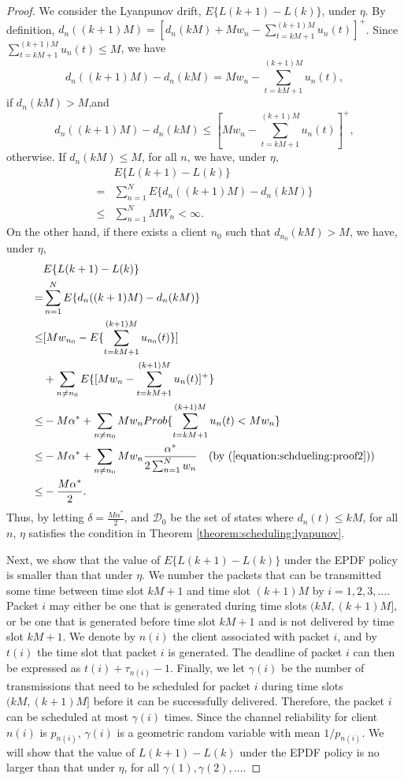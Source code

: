 \documentclass[10pt,nocopyrightspace]{sigplan-proc-varsize-1in}
\begin{document}
\begin{proof}
We consider the Lyanpunov drift, $E\{L(k+1)-L(k)\}$, under $\eta$. By definition, $d_n((k+1)M)=[d_n(kM)+Mw_n-\sum_{t=kM+1}^{(k+1)M}u_n(t)]^+$. Since $\sum_{t=kM+1}^{(k+1)M}u_n(t)\leq M$, we have
\begin{equation}
d_n((k+1)M)-d_n(kM)=Mw_n-\sum_{t=kM+1}^{(k+1)M}u_n(t),
\end{equation}
if $d_n(kM)>M$,and
\begin{equation}
d_n((k+1)M)-d_n(kM)\leq [Mw_n-\sum_{t=kM+1}^{(k+1)M}u_n(t)]^+,
\end{equation}
otherwise. If $d_n(kM)\leq M$, for all $n$, we have, under $\eta$,
\begin{align*}
&E\{L(k+1)-L(k)\}\\
=&\sum_{n=1}^NE\{d_n((k+1)M)-d_n(kM)\}\\
\leq& \sum_{n=1}^NMW_n<\infty.
\end{align*}
On the other hand, if there exists a client $n_0$ such that $d_{n_0}(kM)>M$, we have, under $\eta$,
\begin{align*}
&E\{L(k+1)-L(k)\}\\
=&\sum_{n=1}^NE\{d_n((k+1)M)-d_n(kM)\}\\
\leq& [Mw_{n_0}-E\{\sum_{t=kM+1}^{(k+1)M}u_{n_0}(t)\}]\\
&+\sum_{n\neq n_0}E\{[Mw_n-\sum_{t=kM+1}^{(k+1)M}u_n(t)]^+\}\\
\leq& -M\alpha^*+\sum_{n\neq n_0}Mw_nProb\{\sum_{t=kM+1}^{(k+1)M}u_n(t)<Mw_n\}\\
\leq& -M\alpha^*+\sum_{n\neq n_0}Mw_n\frac{\alpha^*}{2\sum_{n=1}^Nw_n}\hspace{10pt}\mbox{(by (\ref{equation:schdueling:proof2}))}\\
\leq& -\frac{M\alpha^*}{2}.
\end{align*}
Thus, by letting $\delta=\frac{M\alpha^*}{2}$, and $\mathcal{D}_0$ be the set of states where $d_n(t)\leq kM$, for all $n$, $\eta$ satisfies the condition in Theorem \ref{theorem:scheduling:lyapunov}.

Next, we show that the value of $E\{L(k+1)-L(k)\}$ under the EPDF policy is smaller than that under $\eta$. We number the packets that can be transmitted some time between time slot $kM+1$ and time slot $(k+1)M$ by $i=1,2,3,\dots$. Packet $i$ may either be one that is generated during time slots $(kM, (k+1)M]$, or be one that is generated before time slot $kM+1$ and is not delivered by time slot $kM+1$. We denote by $n(i)$ the client associated with packet $i$, and by $t(i)$ the time slot that packet $i$ is generated. The deadline of packet $i$ can then be expressed as $t(i)+\tau_{n(i)}-1$. Finally, we let $\gamma(i)$ be the number of transmissions that need to be scheduled for packet $i$ during time slots $(kM, (k+1)M]$ before it can be successfully delivered. Therefore, the packet $i$ can be scheduled at most $\gamma(i)$ times. Since the channel reliability for client $n(i)$ is $p_{n(i)}$, $\gamma(i)$ is a geometric random variable with mean $1/p_{n(i)}$. We will show that the value of $L(k+1)-L(k)$ under the EPDF policy is no larger than that under $\eta$, for all $\gamma(1),\gamma(2),\dots$.


\end{proof}
\end{document}
